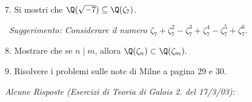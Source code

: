 \bigskip


\item{7.} Si mostri che $\Q(\sqrt{-7})\subseteq
\Q(\zeta_{7})$.

\  \hfil {\it Suggerimento: Considerare il numero
$\zeta_{7}+\zeta_{7}^2-\zeta_{7}^3+\zeta_{7}^4-\zeta_{7}^{5}+\zeta_{7}^6.$}\break
\bigskip

\item{8.} Mostrare che se $n\mid m$, allora $\Q(\zeta_n)\subset
\Q(\zeta_m).$\bigskip

 \item{9.} Risolvere i problemi sulle note di Milne a pagina
29 e 30. \vfill

\bye

\eject

\centerline{\it Alcune Risposte (Esercizi di Teoria di Galois 2. del 17/3/03):}
